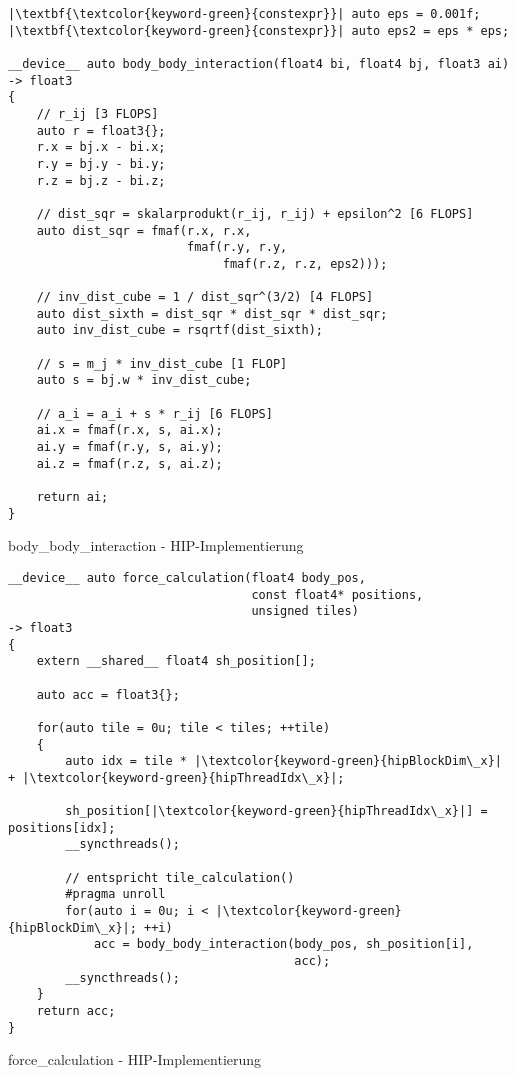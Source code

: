 \begin{code}
    \begin{verbatim}
|\textbf{\textcolor{keyword-green}{constexpr}}| auto eps = 0.001f;
|\textbf{\textcolor{keyword-green}{constexpr}}| auto eps2 = eps * eps;

__device__ auto body_body_interaction(float4 bi, float4 bj, float3 ai)
-> float3
{
    // r_ij [3 FLOPS]
    auto r = float3{};
    r.x = bj.x - bi.x;
    r.y = bj.y - bi.y;
    r.z = bj.z - bi.z;

    // dist_sqr = skalarprodukt(r_ij, r_ij) + epsilon^2 [6 FLOPS]
    auto dist_sqr = fmaf(r.x, r.x,
                         fmaf(r.y, r.y,
                              fmaf(r.z, r.z, eps2)));

    // inv_dist_cube = 1 / dist_sqr^(3/2) [4 FLOPS]
    auto dist_sixth = dist_sqr * dist_sqr * dist_sqr;
    auto inv_dist_cube = rsqrtf(dist_sixth);

    // s = m_j * inv_dist_cube [1 FLOP]
    auto s = bj.w * inv_dist_cube;

    // a_i = a_i + s * r_ij [6 FLOPS]
    ai.x = fmaf(r.x, s, ai.x);
    ai.y = fmaf(r.y, s, ai.y);
    ai.z = fmaf(r.z, s, ai.z);

    return ai;
}
    \end{verbatim}
    \caption{body\_body\_interaction - HIP-Implementierung}
    \label{anhang:hip:bodybodyinteraction}
\end{code}

\begin{code}
    \begin{verbatim}
__device__ auto force_calculation(float4 body_pos,
                                  const float4* positions,
                                  unsigned tiles)
-> float3
{
    extern __shared__ float4 sh_position[];

    auto acc = float3{};

    for(auto tile = 0u; tile < tiles; ++tile)
    {
        auto idx = tile * |\textcolor{keyword-green}{hipBlockDim\_x}| + |\textcolor{keyword-green}{hipThreadIdx\_x}|;

        sh_position[|\textcolor{keyword-green}{hipThreadIdx\_x}|] = positions[idx];
        __syncthreads();

        // entspricht tile_calculation()
        #pragma unroll
        for(auto i = 0u; i < |\textcolor{keyword-green}{hipBlockDim\_x}|; ++i)
            acc = body_body_interaction(body_pos, sh_position[i],
                                        acc);
        __syncthreads();
    }
    return acc;
}
    \end{verbatim}
    \caption{force\_calculation - HIP-Implementierung}
    \label{anhang:hip:forcecalculation}
\end{code}


